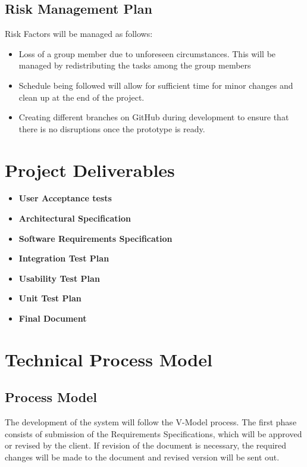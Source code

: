 \documentclass[12pt]{article}
\begin{document}
\subsection{Risk Management Plan}
Risk Factors will be managed as follows:
\begin{itemize}
\item Loss of a group member due to unforeseen circumstances. This will be managed by redistributing the tasks among the group members
\item Schedule being followed will allow for sufficient time for minor changes and clean up at the end of the project.
\item Creating different branches on GitHub during development to ensure that there is no disruptions once the prototype is ready.
\end{itemize}
\newpage

\section{Project Deliverables}

\begin{itemize}
\item \textbf{User Acceptance tests}
\item \textbf{Architectural Specification}
\item \textbf{Software Requirements Specification}
\item \textbf{Integration Test Plan}
\item \textbf{Usability Test Plan}
\item \textbf{Unit Test Plan}
\item \textbf{Final Document}


\end{itemize}

\section{Technical Process Model}

\subsection{Process Model}
The development of the system will follow the V-Model process. The first phase consists of submission of the Requirements Specifications, which will be approved or revised by the client. If revision of the document is necessary, the required changes will be made to the document and revised version will be sent out.
\end{document}

